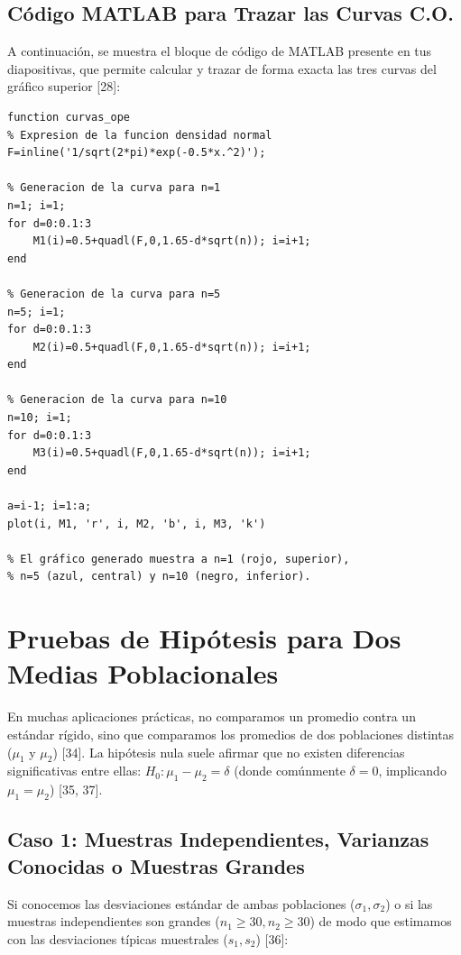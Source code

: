 \documentclass{article}
\begin{document}
\subsection{Código MATLAB para Trazar las Curvas C.O.}

A continuación, se muestra el bloque de código de MATLAB presente en tus diapositivas, que permite calcular y trazar de forma exacta las tres curvas del gráfico superior [28]:

\begin{tcolorbox}[colback=black!5, colframe=black!70, fonttitle=\bfseries\sffamily, title=Función de Trazado Matlab]
\begin{verbatim}
function curvas_ope
% Expresion de la funcion densidad normal
F=inline('1/sqrt(2*pi)*exp(-0.5*x.^2)');

% Generacion de la curva para n=1
n=1; i=1; 
for d=0:0.1:3
    M1(i)=0.5+quadl(F,0,1.65-d*sqrt(n)); i=i+1;
end

% Generacion de la curva para n=5
n=5; i=1;
for d=0:0.1:3
    M2(i)=0.5+quadl(F,0,1.65-d*sqrt(n)); i=i+1;
end

% Generacion de la curva para n=10
n=10; i=1;
for d=0:0.1:3
    M3(i)=0.5+quadl(F,0,1.65-d*sqrt(n)); i=i+1;
end

a=i-1; i=1:a;
plot(i, M1, 'r', i, M2, 'b', i, M3, 'k')

% El gráfico generado muestra a n=1 (rojo, superior),
% n=5 (azul, central) y n=10 (negro, inferior).
\end{verbatim}
\end{tcolorbox}

\newpage
\section{Pruebas de Hipótesis para Dos Medias Poblacionales}

En muchas aplicaciones prácticas, no comparamos un promedio contra un estándar rígido, sino que comparamos los promedios de dos poblaciones distintas ($\mu_1$ y $\mu_2$) [34]. La hipótesis nula suele afirmar que no existen diferencias significativas entre ellas: $H_0: \mu_1 - \mu_2 = \delta$ (donde comúnmente $\delta = 0$, implicando $\mu_1 = \mu_2$) [35, 37].

\subsection{Caso 1: Muestras Independientes, Varianzas Conocidas o Muestras Grandes}
Si conocemos las desviaciones estándar de ambas poblaciones ($\sigma_1, \sigma_2$) o si las muestras independientes son grandes ($n_1 \ge 30, n_2 \ge 30$) de modo que estimamos con las desviaciones típicas muestrales ($s_1, s_2$) [36]:
\end{document}
